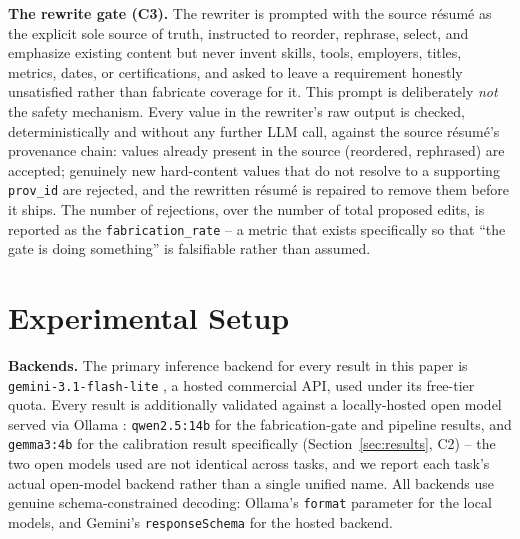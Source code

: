 \documentclass{article}
\begin{document}
\textbf{The rewrite gate (C3).} The rewriter is prompted with the source résumé as the explicit
sole source of truth, instructed to reorder, rephrase, select, and emphasize existing content but
never invent skills, tools, employers, titles, metrics, dates, or certifications, and asked to
leave a requirement honestly unsatisfied rather than fabricate coverage for it. This prompt is
deliberately \emph{not} the safety mechanism. Every value in the rewriter's raw output is checked,
deterministically and without any further LLM call, against the source résumé's provenance chain:
values already present in the source (reordered, rephrased) are accepted; genuinely new
hard-content values that do not resolve to a supporting \texttt{prov\_id} are rejected, and the
rewritten résumé is repaired to remove them before it ships. The number of rejections, over the
number of total proposed edits, is reported as the \texttt{fabrication\_rate} -- a metric that
exists specifically so that ``the gate is doing something'' is falsifiable rather than assumed.

\section{Experimental Setup}

\textbf{Backends.} The primary inference backend for every result in this paper is
\texttt{gemini-3.1-flash-lite} \citep{gemini}, a hosted commercial API, used under its free-tier
quota. Every result is additionally validated against a locally-hosted open model served via
Ollama \citep{ollama}: \texttt{qwen2.5:14b} \citep{qwen25} for the fabrication-gate and pipeline
results, and \texttt{gemma3:4b} for the calibration result specifically (Section~\ref{sec:results},
C2) -- the two open models used are not identical across tasks, and we report each task's actual
open-model backend rather than a single unified name. All backends use genuine
schema-constrained decoding: Ollama's \texttt{format} parameter for the local models, and Gemini's
\texttt{responseSchema} for the hosted backend.
\end{document}
